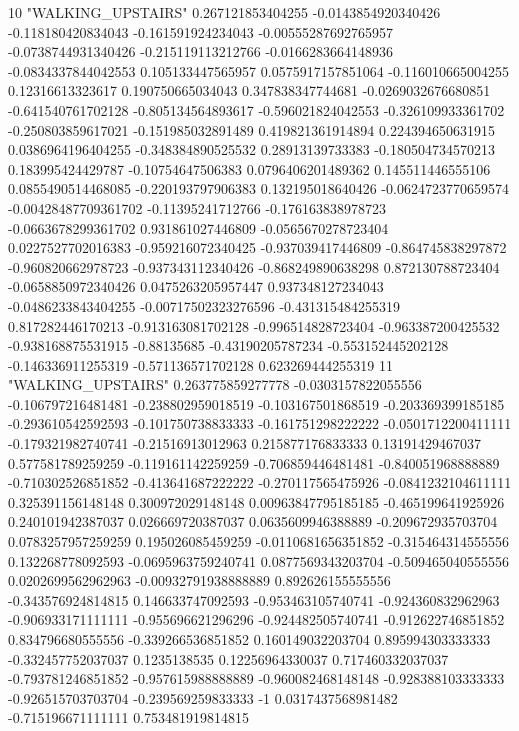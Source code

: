10 "WALKING_UPSTAIRS" 0.267121853404255 -0.0143854920340426 -0.118180420834043 -0.161591924234043 -0.00555287692765957 -0.0738744931340426 -0.215119113212766 -0.0166283664148936 -0.0834337844042553 0.105133447565957 0.0575917157851064 -0.116010665004255 0.12316613323617 0.190750665034043 0.347838347744681 -0.0269032676680851 -0.641540761702128 -0.805134564893617 -0.596021824042553 -0.326109933361702 -0.250803859617021 -0.151985032891489 0.419821361914894 0.224394650631915 0.0386964196404255 -0.348384890525532 0.28913139733383 -0.180504734570213 0.183995424429787 -0.10754647506383 0.0796406201489362 0.145511446555106 0.0855490514468085 -0.220193797906383 0.132195018640426 -0.0624723770659574 -0.00428487709361702 -0.11395241712766 -0.176163838978723 -0.0663678299361702 0.931861027446809 -0.0565670278723404 0.0227527702016383 -0.959216072340425 -0.937039417446809 -0.864745838297872 -0.960820662978723 -0.937343112340426 -0.868249890638298 0.872130788723404 -0.0658850972340426 0.0475263205957447 0.937348127234043 -0.0486233843404255 -0.00717502323276596 -0.431315484255319 0.817282446170213 -0.913163081702128 -0.996514828723404 -0.963387200425532 -0.938168875531915 -0.88135685 -0.43190205787234 -0.553152445202128 -0.146336911255319 -0.571136571702128 0.623269444255319
11 "WALKING_UPSTAIRS" 0.263775859277778 -0.0303157822055556 -0.106797216481481 -0.238802959018519 -0.103167501868519 -0.203369399185185 -0.293610542592593 -0.101750738833333 -0.161751298222222 -0.0501712200411111 -0.179321982740741 -0.21516913012963 0.215877176833333 0.13191429467037 0.577581789259259 -0.119161142259259 -0.706859446481481 -0.840051968888889 -0.710302526851852 -0.413641687222222 -0.270117565475926 -0.0841232104611111 0.325391156148148 0.300972029148148 0.00963847795185185 -0.465199641925926 0.240101942387037 0.026669720387037 0.0635609946388889 -0.209672935703704 0.0783257957259259 0.195026085459259 -0.0110681656351852 -0.315464314555556 0.132268778092593 -0.0695963759240741 0.0877569343203704 -0.509465040555556 0.0202699562962963 -0.00932791938888889 0.892626155555556 -0.343576924814815 0.146633747092593 -0.953463105740741 -0.924360832962963 -0.906933171111111 -0.955696621296296 -0.924482505740741 -0.912622746851852 0.834796680555556 -0.339266536851852 0.160149032203704 0.895994303333333 -0.332457752037037 0.1235138535 0.12256964330037 0.717460332037037 -0.793781246851852 -0.957615988888889 -0.960082468148148 -0.928388103333333 -0.926515703703704 -0.239569259833333 -1 0.0317437568981482 -0.715196671111111 0.753481919814815
